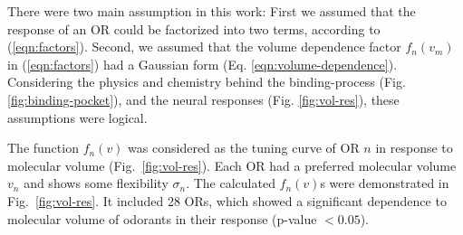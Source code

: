 \documentclass[11pt]{paper} %
\newcommand{\numberofreceptors}{ 28 }
\begin{document}
There were two main assumption in this work: 
First we assumed that the response of an OR could be factorized into two terms, 
according to (\ref{eqn:factors}).
Second, we assumed that the volume dependence factor $f_n(v_m)$ in (\ref{eqn:factors}) 
had a Gaussian form (Eq. \ref{eqn:volume-dependence}).
Considering the physics and chemistry behind the binding-process (Fig. \ref{fig:binding-pocket}), 
and the neural responses (Fig. \ref{fig:vol-res}), 
these assumptions were logical. 


The function $f_n(v)$ was considered as the tuning curve of OR $n$ in response to molecular volume (Fig.~\ref{fig:vol-res}). 
Each OR had a preferred molecular volume $v_n$ and shows some flexibility $\sigma_n$. 
The calculated $f_n(v)$s were demonstrated in  Fig.~\ref{fig:vol-res}. 
It included \numberofreceptors ORs, 
which showed a significant dependence to molecular volume of odorants in their response (p-value $<0.05$).
\end{document}
